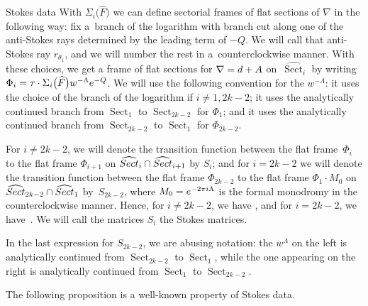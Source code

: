 \documentclass[11pt]{article}
\numberwithin{equation}{section}
\numberwithin{equation}{section}
\begin{document}
\begin{subsubsection}{Stokes data}
With $\Sigma_i\bigl(\widehat{F}\bigr)$ we can define sectorial frames of flat sections of $\nabla$ in the following way: fix a~branch of the logarithm with branch cut along one of the anti-Stokes rays determined by the leading term of $-Q$. We will call that anti-Stokes ray $r_{\theta_1}$, and we will number the rest in a~counterclockwise manner. With these choices, we get a frame of flat sections for $\nabla={\rm d}+A$ on~$\widehat{\operatorname{Sect}}_i$ by writing $\Phi_i=\tau \cdot \Sigma_i\bigl(\widehat{F}\bigr)w^{-\Lambda} {\rm e}^{-Q}$. We will use the following convention for the $w^{-\Lambda}$: it uses the choice of the branch of the logarithm if $i\neq 1,2k-2$; it uses the analytically continued branch from $\operatorname{Sect}_1$ to $\operatorname{Sect}_{2k-2}$ for $\Phi_1$; and it uses the analytically continued branch from $\operatorname{Sect}_{2k-2}$ to $\operatorname{Sect}_{1}$ for $\Phi_{2k-2}$.

\begin{Definition} \label{defStokesmatrices} For $i\neq 2k-2$, we will denote the transition function between the flat frame~$\Phi_{i}$ to the flat frame $\Phi_{i+1}$ on $\widehat{\textnormal{Sect}}_{i}\cap\widehat{\textnormal{Sect}}_{i+1}$ by $S_{i}$; and for $i=2k-2$ we will denote the transition function between the flat frame $\Phi_{2k-2}$ to the flat frame $\Phi_1 \cdot M_0$ on~${\widehat{\textnormal{Sect}}_{2k-2}\cap\widehat{\textnormal{Sect}}_{1}}$ by~$S_{2k-2}$, where $M_0={\rm e}^{-2\pi {\rm i} \Lambda}$ is the formal monodromy in the counterclockwise manner.
Hence, for $i\neq 2k-2$, we have , and for $i=2k-2$, we have~. We will call the matrices $S_i$ the Stokes matrices.
\end{Definition}

\begin{Remark} In the last expression for $S_{2k-2}$, we are abusing notation: the $w^{\Lambda}$ on the left is analytically continued from $\operatorname{Sect}_{2k-2}$ to $\operatorname{Sect}_1$, while the one appearing on the right is analytically continued from $\operatorname{Sect}_1$ to $\operatorname{Sect}_{2k-2}$.
\end{Remark}

The following proposition is a well-known property of Stokes data.


\end{subsubsection}
\end{document}
